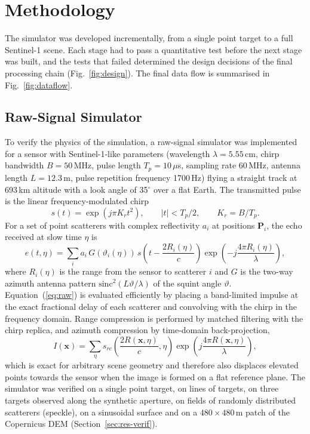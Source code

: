 \chapter{Methodology}
\label{ch:method}
The simulator was developed incrementally, from a single point target to a full Sentinel-1 scene. Each stage had to pass a quantitative test before the next stage was built, and the tests that failed determined the design decisions of the final processing chain (Fig.~\ref{fig:design}). The final data flow is summarised in Fig.~\ref{fig:dataflow}.

\section{Raw-Signal Simulator}
\label{sec:raw}
To verify the physics of the simulation, a raw-signal simulator was implemented for a sensor with Sentinel-1-like parameters (wavelength $\lambda=5.55$\,cm, chirp bandwidth $B=50$\,MHz, pulse length $T_p=10\,\mu$s, sampling rate 60\,MHz, antenna length $L=12.3$\,m, pulse repetition frequency 1700\,Hz) flying a straight track at 693\,km altitude with a look angle of 35$^\circ$ over a flat Earth. The transmitted pulse is the linear frequency-modulated chirp
\begin{equation}
s(t)=\exp\!\left(j\pi K_r t^2\right),\qquad |t|<T_p/2,\qquad K_r=B/T_p .
\end{equation}
For a set of point scatterers with complex reflectivity $a_i$ at positions $\mathbf{P}_i$, the echo received at slow time $\eta$ is
\begin{equation}
e(t,\eta)=\sum_i a_i\,G\!\left(\vartheta_i(\eta)\right)\,s\!\left(t-\frac{2R_i(\eta)}{c}\right)\exp\!\left(-j\frac{4\pi R_i(\eta)}{\lambda}\right),
\label{eq:raw}
\end{equation}
where $R_i(\eta)$ is the range from the sensor to scatterer $i$ and $G$ is the two-way azimuth antenna pattern $\mathrm{sinc}^2(L\vartheta/\lambda)$ of the squint angle $\vartheta$. Equation~(\ref{eq:raw}) is evaluated efficiently by placing a band-limited impulse at the exact fractional delay of each scatterer and convolving with the chirp in the frequency domain. Range compression is performed by matched filtering with the chirp replica, and azimuth compression by time-domain back-projection,
\begin{equation}
I(\mathbf{x})=\sum_{\eta} s_{rc}\!\left(\frac{2R(\mathbf{x},\eta)}{c},\eta\right)\exp\!\left(j\frac{4\pi R(\mathbf{x},\eta)}{\lambda}\right),
\end{equation}
which is exact for arbitrary scene geometry and therefore also displaces elevated points towards the sensor when the image is formed on a flat reference plane. The simulator was verified on a single point target, on lines of targets, on three targets observed along the synthetic aperture, on fields of randomly distributed scatterers (speckle), on a sinusoidal surface and on a $480\times480$\,m patch of the Copernicus DEM (Section~\ref{sec:res-verif}).

